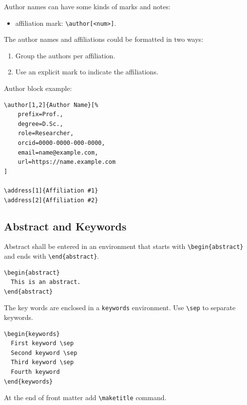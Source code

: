 \documentclass[
]{ceurart}
\begin{document}
Author names can have some kinds of marks and notes:
\begin{itemize}
\item affiliation mark: \verb|\author[<num>]|.
\end{itemize}

The author names and affiliations could be formatted in two ways:
\begin{enumerate}
\item Group the authors per affiliation.
\item Use an explicit mark to indicate the affiliations.
\end{enumerate}

Author block example:
\begin{lstlisting}
\author[1,2]{Author Name}[%
    prefix=Prof.,
    degree=D.Sc.,
    role=Researcher,
    orcid=0000-0000-000-0000,
    email=name@example.com,
    url=https://name.example.com
]

\address[1]{Affiliation #1}
\address[2]{Affiliation #2}
\end{lstlisting}

\subsection{Abstract and Keywords}

Abstract shall be entered in an environment that starts
with \verb|\begin{abstract}| and ends with
\verb|\end{abstract}|. 

\begin{lstlisting}
\begin{abstract}
  This is an abstract.
\end{abstract}
\end{lstlisting}

The key words are enclosed in a \verb|keywords|
environment. Use \verb|\sep| to separate keywords.

\begin{lstlisting}
\begin{keywords}
  First keyword \sep 
  Second keyword \sep 
  Third keyword \sep 
  Fourth keyword
\end{keywords}
\end{lstlisting}

At the end of front matter add \verb|\maketitle| command.
\end{document}
